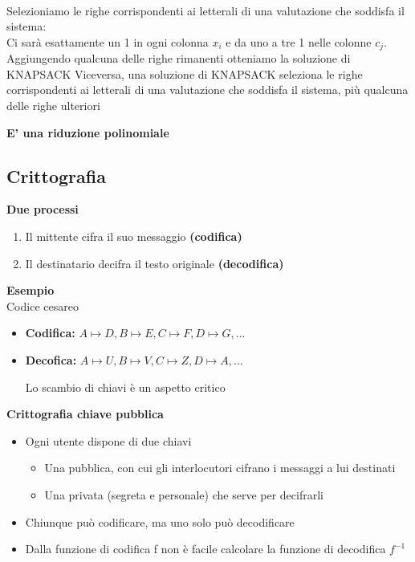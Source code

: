 \\Selezioniamo le righe corrispondenti ai letterali di una valutazione che soddisfa il sistema:\\
Ci sarà esattamente un 1 in ogni colonna $x_i$ e da uno a tre 1 nelle colonne $c_j$.
Aggiungendo qualcuna delle righe rimanenti otteniamo la soluzione di KNAPSACK
Viceversa, una soluzione di KNAPSACK seleziona le righe corrispondenti ai letterali di una
valutazione che soddisfa il sistema, più qualcuna delle righe ulteriori
\begin{center}
    \textbf{E' una riduzione polinomiale}
\end{center}
\newpage
\subsection{Crittografia}
\textbf{Due processi}
\begin{enumerate}
    \item Il mittente cifra il suo messaggio \textbf{(codifica)}
    
    \item Il destinatario decifra il testo originale \textbf{(decodifica)}
\end{enumerate}
\textbf{Esempio}\\
Codice cesareo
\begin{itemize}
    \item \textbf{Codifica:} $A \mapsto D, B \mapsto E, C \mapsto F, D \mapsto G, ...$
    
    \item \textbf{Decofica:} $A \mapsto U, B \mapsto V, C \mapsto Z, D \mapsto A, ...$
    
Lo scambio di chiavi è un aspetto critico
\end{itemize}
\textbf{Crittografia chiave pubblica}
\begin{itemize}
    \item Ogni utente dispone di due chiavi
    
        \begin{itemize}
            \item Una pubblica, con cui gli interlocutori cifrano i messaggi a lui destinati
            
            \item Una privata (segreta e personale) che serve per decifrarli
        \end{itemize}
    
    \item Chiunque può codificare, ma uno solo può decodificare
    
    \item Dalla funzione di codifica f non è facile calcolare la funzione di decodifica $f^{-1}$
\end{itemize}
\newpage
